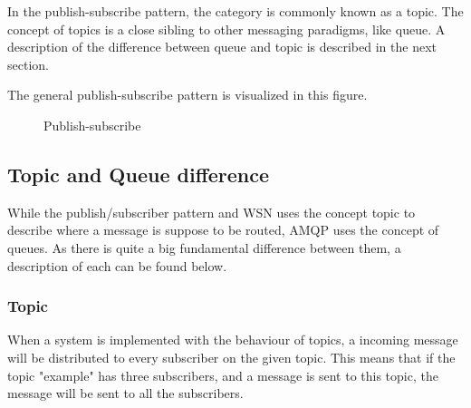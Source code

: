 In the publish-subscribe pattern, the category is commonly known as a topic. The concept of topics is a close sibling to other messaging paradigms, like queue. A description of the difference between queue and topic is described in the next section. 

The general publish-subscribe pattern is visualized in this figure.

\begin{center}
  \begin{figure}[ht]
    \caption{Publish-subscribe}
    \label{fig:publish-subscribe}
  \end{figure}
\end{center}

\subsection{Topic and Queue difference}
\label{subsec:architecture_and_implementation-topic_and_queue_differecnce}
While the publish/subscriber pattern and WSN uses the concept topic to describe where a message is suppose to be routed, AMQP uses the concept of queues. As there is quite a big fundamental difference between them, a description of each can be found below. 

\subsubsection{Topic}
When a system is implemented with the behaviour of topics, a incoming message will be distributed to every subscriber on the given topic. This means that if the topic "example" has three subscribers, and a message is sent to this topic, the message will be sent to all the subscribers.

